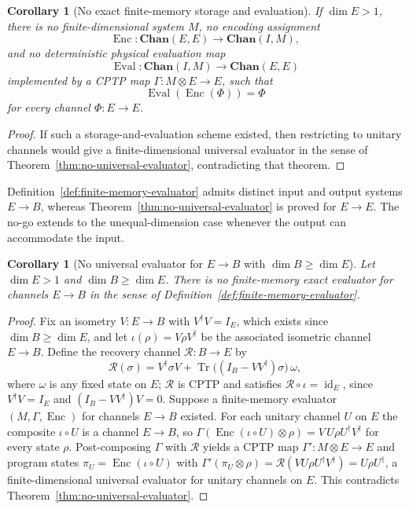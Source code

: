 \documentclass[11pt]{article}
\newtheorem{corollary}[theorem]{Corollary}
\DeclareMathOperator{\Tr}{Tr}
\DeclareMathOperator{\id}{id}
\begin{document}
\begin{corollary}[No exact finite-memory storage and evaluation]
\label{cor:no-finite-memory-storage}
If $\dim E>1$, there is no finite-dimensional system $M$, no encoding
assignment
\[
\operatorname{Enc}:
\mathbf{Chan}(E,E)
\longrightarrow
\mathbf{Chan}(I,M),
\]
and no deterministic physical evaluation map
\[
\operatorname{Eval}:
\mathbf{Chan}(I,M)
\longrightarrow
\mathbf{Chan}(E,E)
\]
implemented by a CPTP map $\Gamma:M\otimes E\to E$, such that
\[
\operatorname{Eval}(\operatorname{Enc}(\Phi))=\Phi
\]
for every channel $\Phi:E\to E$.
\end{corollary}

\begin{proof}
If such a storage-and-evaluation scheme existed, then restricting to unitary
channels would give a finite-dimensional universal evaluator in the sense of
Theorem~\ref{thm:no-universal-evaluator}, contradicting that theorem.
\end{proof}

Definition~\ref{def:finite-memory-evaluator} admits distinct input and output
systems $E\to B$, whereas Theorem~\ref{thm:no-universal-evaluator} is proved for
$E\to E$. The no-go extends to the unequal-dimension case whenever the output
can accommodate the input.

\begin{corollary}[No universal evaluator for $E\to B$ with $\dim B\ge\dim E$]
\label{cor:no-universal-evaluator-EB}
Let $\dim E>1$ and $\dim B\ge\dim E$. There is no finite-memory exact evaluator
for channels $E\to B$ in the sense of Definition~\ref{def:finite-memory-evaluator}.
\end{corollary}

\begin{proof}
Fix an isometry $V:E\to B$ with $V^\dagger V=I_E$, which exists since
$\dim B\ge\dim E$, and let $\iota(\rho)=V\rho V^\dagger$ be the associated
isometric channel $E\to B$. Define the recovery channel $\mathcal R:B\to E$ by
\[
\mathcal R(\sigma)=V^\dagger\sigma V+\Tr\!\bigl((I_B-VV^\dagger)\sigma\bigr)\,\omega,
\]
where $\omega$ is any fixed state on $E$; $\mathcal R$ is CPTP and satisfies
$\mathcal R\circ\iota=\id_E$, since $V^\dagger V=I_E$ and $(I_B-VV^\dagger)V=0$.
Suppose a finite-memory evaluator $(M,\Gamma,\operatorname{Enc})$ for channels
$E\to B$ existed. For each unitary channel $U$ on $E$ the composite
$\iota\circ U$ is a channel $E\to B$, so
$\Gamma(\operatorname{Enc}(\iota\circ U)\otimes\rho)=V\,U\rho U^\dagger V^\dagger$
for every state $\rho$. Post-composing $\Gamma$ with $\mathcal R$ yields a CPTP
map $\Gamma':M\otimes E\to E$ and program states
$\pi_U=\operatorname{Enc}(\iota\circ U)$ with
$\Gamma'(\pi_U\otimes\rho)=\mathcal R(V U\rho U^\dagger V^\dagger)=U\rho U^\dagger$,
a finite-dimensional universal evaluator for unitary channels on $E$. This
contradicts Theorem~\ref{thm:no-universal-evaluator}.
\end{proof}
\end{document}

